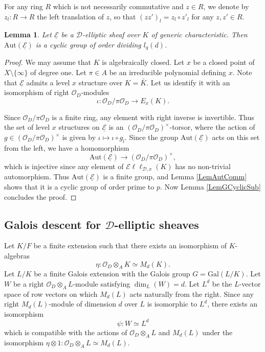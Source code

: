 \documentclass[10pt]{amsart}
\theoremstyle{plain}
\newtheorem{lem}[thm]{Lemma}
\theoremstyle{definition}
\newcommand{\Aut}{\mathrm{Aut}}
\newcommand{\Gal}{\mathrm{Gal}}
\newcommand{\cO}{\mathcal{O}}
\newcommand{\sEll}{\mathscr{E}\ell\ell}
\newcommand{\ucE}{\underline{\mathcal{E}}}
\newcommand{\sD}{\mathscr{D}}
\begin{document}
For any ring $R$ which is not necessarily commutative and $z\in R$,
we denote by $z_l:R\to R$ the left translation of $z$,
so that $(z z')_l=z_l\circ z'_l$ for any $z,z'\in R$.

\begin{lem}\label{LemAutGen}
	Let $\ucE$ be a $\sD$-elliptic sheaf over $K$ of generic characteristic. 
	Then $\Aut(\ucE)$ is a cyclic group of order dividing $l_q(d)$.
\end{lem} 
\begin{proof}
	We may assume that $K$ is algebraically closed. Let $x$ be a closed point of $X\setminus\{\infty\}$ of degree one.
	Let $\pi\in A$ be an irreducible polynomial defining $x$. Note that $\ucE$ admits a level $x$ structure over $K=\bar{K}$.
	Let us identify it with an
	isomorphism of right $\cO_D$-modules
	\[
	\iota: \cO_D/\pi \cO_D\to E_x(K).
	\]
	
	Since $\cO_D/\pi \cO_D$ is a finite ring, any element with right inverse is invertible.
	Thus the set of level $x$ structures on $\ucE$ is an $(\cO_D/\pi \cO_D)^\times$-torsor,
	where the action of $g\in (\cO_D/\pi \cO_D)^\times$ is given by $\iota\mapsto \iota\circ g_l$.
	Since the group $\Aut(\ucE)$ acts on this set from the left,
	we have a homomorphism
	\[
	\Aut(\ucE)\to (\cO_D/\pi \cO_D)^\times,
	\]
	which is injective since any element of $\sEll_{\sD,x}(K)$ has no non-trivial automorphism.
	Thus $\Aut(\ucE)$ is a finite group, and Lemma \ref{LemAutComm} shows that it is a cyclic group of order prime to $p$.
	Now Lemma \ref{LemGCyclicSub} concludes the proof.
\end{proof}

\subsection{Galois descent for $\sD$-elliptic sheaves}\label{SubsecGaloisDescent}

Let $K/F$ be a finite extension such that there exists an isomorphism of $K$-algebras 
\[
\eta:\cO_D\otimes_A K\simeq M_d(K).
\]
Let $L/K$ be a finite Galois extension with the Galois group $G=\Gal(L/K)$.
Let $W$ be a right $\cO_D\otimes_A L$-module satisfying $\dim_L(W)=d$.
Let $L^d$ be the $L$-vector space of row vectors on which $M_d(L)$ acts naturally from the right.
Since any right $M_d(L)$-module of dimension $d$ over $L$ is isomorphic to $L^d$,
there exists an isomorphism
\[
\psi: W\simeq  L^d
\]
which is compatible with the actions of $\cO_D\otimes_A L$ and $M_d(L)$ under 
the isomorphism $\eta\otimes 1: \cO_D\otimes_A L\simeq M_d(L)$.
\end{document}
